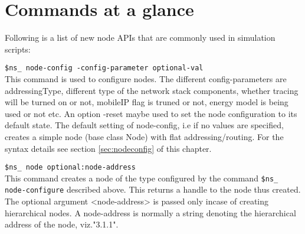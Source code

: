 \section{Commands at a glance}
\label{sec:newnodecommand}

Following is a list of new node APIs that are commonly used in simulation
scripts:

\begin{flushleft}
{\tt \$ns\_ node-config -\<config-parameter\> \<optional-val\>}\\
This command is used to configure nodes. The different config-parameters
are addressingType, different type of the network stack components,
whether tracing will be turned on or not, mobileIP flag is truned or not,
energy model is being used or not etc. An option -reset maybe used to set
the node configuration to its default state. The default setting of 
node-config, i.e if no values are specified, creates a simple node (base
class Node) with flat addressing/routing. For the syntax details see
section \ref{sec:nodeconfig} of this chapter.  


{\tt \$ns\_ node \<optional:node-address\>}\\
This command creates a node of the type configured by the command
{\tt \$ns\_ node-configure} described above. This returns a handle to the
node thus created. The optional argument <node-address> is passed only
incase of creating hierarchical nodes. A node-address is normally a
string denoting the hierarchical address of the node, viz."3.1.1".

\end{flushleft}
